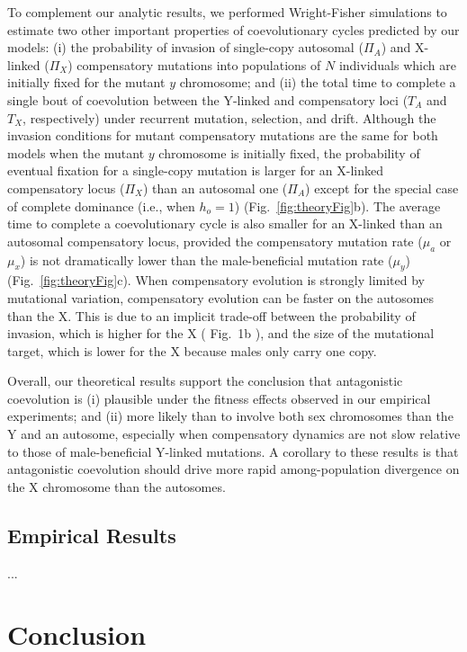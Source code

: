 \documentclass{article}
\newcommand\hl[1]{%
  \bgroup
  \hskip0pt\color{blue!80!black}%
  #1%
  \egroup
}
\begin{document}
To complement our analytic results, we performed Wright-Fisher simulations to estimate two other important properties of coevolutionary cycles predicted by our models: (i) the probability of invasion of single-copy autosomal ($\Pi_A$) and X-linked ($\Pi_X$) compensatory mutations into populations of $N$ individuals which are initially fixed for the mutant $y$ chromosome; and (ii) the total time to complete a single bout of coevolution between the Y-linked and compensatory loci ($T_{A}$ and $T_{X}$, respectively) under recurrent mutation, selection, and drift. Although the invasion conditions for mutant compensatory mutations are the same for both models when the mutant $y$ chromosome is initially fixed, the probability of eventual fixation for a single-copy mutation is larger for an X-linked compensatory locus ($\Pi_X$) than an autosomal one ($\Pi_A$) except for the special case of complete dominance (i.e., when $h_o = 1$) (Fig.~\ref{fig:theoryFig}b). The average time to complete a coevolutionary cycle is also smaller for an X-linked than an autosomal compensatory locus, provided the compensatory mutation rate ($\mu_a$ or $\mu_x$) is not dramatically lower than the male-beneficial mutation rate ($\mu_y$) (Fig.~\ref{fig:theoryFig}c). When compensatory evolution is strongly limited by mutational variation, compensatory evolution can be faster on the autosomes than the X. This is due to an implicit trade-off between the probability of invasion, which is higher for the X (\hl{Fig.~1b}), and the size of the mutational target, which is lower for the X because males only carry one copy.

Overall, our theoretical results support the conclusion that antagonistic coevolution is (i) plausible under the fitness effects observed in our empirical experiments; and (ii) more likely than to involve both sex chromosomes than the Y and an autosome, especially when compensatory dynamics are not slow relative to those of male-beneficial Y-linked mutations. A corollary to these results is that antagonistic coevolution should drive more rapid among-population divergence on the X chromosome than the autosomes.


\subsection{Empirical Results} \label{subsec:EmpirRes}

...


\section{Conclusion} \label{sec:Conclusion}
\end{document}
